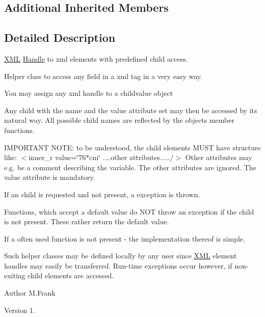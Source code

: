 \subsection*{Additional Inherited Members}


\subsection{Detailed Description}
\hyperlink{namespace_d_d4hep_1_1_x_m_l}{X\+ML} \hyperlink{class_d_d4hep_1_1_handle}{Handle} to xml elements with predefined child access. 

Helper class to access any field in a xml tag in a very easy way.
\begin{DoxyItemize}
\item You may assign any xml handle to a childvalue object
\item Any child with the name and the value attribute set may then be accessed by it\textquotesingle{}s natural way. All possible child names are reflected by the object\textquotesingle{}s member functions.

I\+M\+P\+O\+R\+T\+A\+NT N\+O\+TE\+: to be understood, the child elements M\+U\+ST have structure like\+: $<$inner\+\_\+r value=\char`\"{}76$\ast$cm\char`\"{} ....other attributes...../$>$ Other attributes may e.\+g. be a comment describing the variable. The \textquotesingle{}other attributes\textquotesingle{} are ignored. The \textquotesingle{}value\textquotesingle{} attribute is mandatory.
\item If an child is requested and not present, a exception is thrown.
\item Functions, which accept a default value do N\+OT throw an exception if the child is not present. These rather return the default value.
\item If a often used function is not present -\/ the implementation thereof is simple.
\end{DoxyItemize}

Such helper classes may be defined locally by any user since \hyperlink{namespace_d_d4hep_1_1_x_m_l}{X\+ML} element handles may easily be transferred. Run-\/time exceptions occur however, if non-\/exiting child elements are accessed.

\begin{DoxyAuthor}{Author}
M.\+Frank 
\end{DoxyAuthor}
\begin{DoxyVersion}{Version}
1. 
\end{DoxyVersion}


